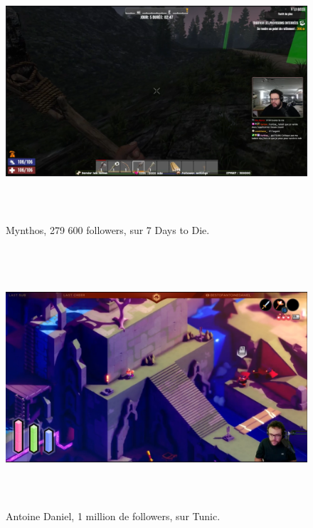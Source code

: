 \documentclass[
]{article}
\begin{document}
\begin{figure}
\centering
\includegraphics[width=17cm,height=9.59cm]{../assets/Pictures/10000201000004B0000002A59C804766341ECEC8.png}
\caption{Mynthos, 279 600 followers, sur 7 Days to Die.}\label{fig:fig-2--2-2}
\end{figure}

\begin{figure}
\centering
\includegraphics[width=17cm,height=9.608cm]{../assets/Pictures/10000201000004AC000002A4296D0393AE6C478A.png}
\caption{Antoine Daniel, 1 million de followers, sur Tunic.}\label{fig:fig-2--2-3}
\end{figure}
\end{document}
